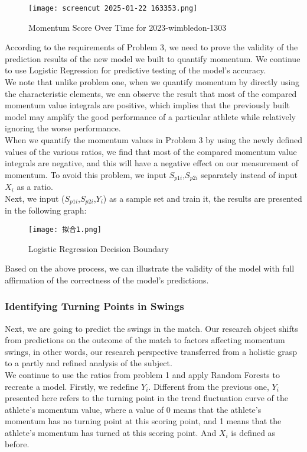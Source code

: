 \documentclass{mcmthesis}
\begin{document}
\begin{figure}[htbp]
    \centering
    \texttt{[image: screencut 2025-01-22 163353.png]}
    \caption{Momentum Score Over Time for 2023-wimbledon-1303} \label{Figure 19}
\end{figure}

According to the requirements of Problem 3, we need to prove the validity of the prediction
results of the new model we built to quantify momentum. We continue to use Logistic Regression
for predictive testing of the model's accuracy.\\
We note that unlike problem one, when we quantify momentum by directly using the characteristic elements, we can observe the result that most of the compared momentum value
integrals are positive, which implies that the previously built model may amplify the good
performance of a particular athlete while relatively ignoring the worse performance.\\
When we quantify the momentum values in Problem 3 by using the newly defined values of
the various ratios, we find that most of the compared momentum value integrals are negative, and
this will have a negative effect on our measurement of momentum. To avoid this problem, we
input $S_{p1i}$,$S_{p2i}$ separately instead of input $X_{i}$ as a ratio.\\
Next, we input ($S_{p1i}$,$S_{p2i}$,$Y_{i}$) as a sample set and train it, the results are presented in the
following graph:

\begin{figure}[htbp]
    \centering
    \texttt{[image: 拟合1.png]}
    \caption{Logistic Regression Decision Boundary} \label{Figure 20}
\end{figure}

Based on the above process, we can illustrate the validity of the model with full affirmation
of the correctness of the model's predictions.

\subsubsection{Identifying Turning Points in Swings}
Next, we are going to predict the swings in the match. Our research object shifts from
predictions on the outcome of the match to factors affecting momentum swings, in other words, our research perspective transferred from a holistic grasp to a partly and refined analysis of the
subject.\\
We continue to use the ratios from problem 1 and apply Random Forests to recreate a model. Firstly, we redefine $Y_{i}$. Different from the previous one, $Y_{i}$presented here refers to the turning
point in the trend fluctuation curve of the athlete's momentum value, where a value of 0 means
that the athlete's momentum has no turning point at this scoring point, and 1 means that the
athlete's momentum has turned at this scoring point. And $X_{i}$ is defined as before.
\end{document}
